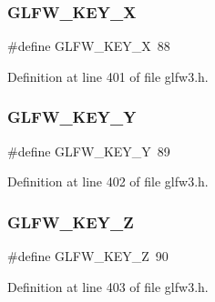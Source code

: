 \subsubsection{\texorpdfstring{GLFW\_KEY\_X}{GLFW\_KEY\_X}}
{\footnotesize\ttfamily \#define G\+L\+F\+W\+\_\+\+K\+E\+Y\+\_\+X~88}



Definition at line 401 of file glfw3.\+h.

\mbox{\label{group__keys_gafd9f115a549effdf8e372a787c360313}} 
\subsubsection{\texorpdfstring{GLFW\_KEY\_Y}{GLFW\_KEY\_Y}}
{\footnotesize\ttfamily \#define G\+L\+F\+W\+\_\+\+K\+E\+Y\+\_\+Y~89}



Definition at line 402 of file glfw3.\+h.

\mbox{\label{group__keys_gac489e208c26afda8d4938ed88718760a}} 
\subsubsection{\texorpdfstring{GLFW\_KEY\_Z}{GLFW\_KEY\_Z}}
{\footnotesize\ttfamily \#define G\+L\+F\+W\+\_\+\+K\+E\+Y\+\_\+Z~90}



Definition at line 403 of file glfw3.\+h.

